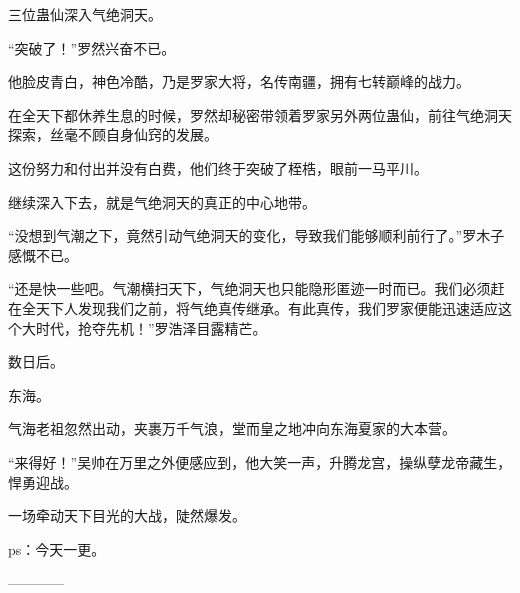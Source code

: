 \begin{this_body}
三位蛊仙深入气绝洞天。

“突破了！”罗然兴奋不已。

他脸皮青白，神色冷酷，乃是罗家大将，名传南疆，拥有七转巅峰的战力。

在全天下都休养生息的时候，罗然却秘密带领着罗家另外两位蛊仙，前往气绝洞天探索，丝毫不顾自身仙窍的发展。

这份努力和付出并没有白费，他们终于突破了桎梏，眼前一马平川。

继续深入下去，就是气绝洞天的真正的中心地带。

“没想到气潮之下，竟然引动气绝洞天的变化，导致我们能够顺利前行了。”罗木子感慨不已。

“还是快一些吧。气潮横扫天下，气绝洞天也只能隐形匿迹一时而已。我们必须赶在全天下人发现我们之前，将气绝真传继承。有此真传，我们罗家便能迅速适应这个大时代，抢夺先机！”罗浩泽目露精芒。

数日后。

东海。

气海老祖忽然出动，夹裹万千气浪，堂而皇之地冲向东海夏家的大本营。

“来得好！”吴帅在万里之外便感应到，他大笑一声，升腾龙宫，操纵孽龙帝藏生，悍勇迎战。

一场牵动天下目光的大战，陡然爆发。

ps：今天一更。

------------

\end{this_body}

